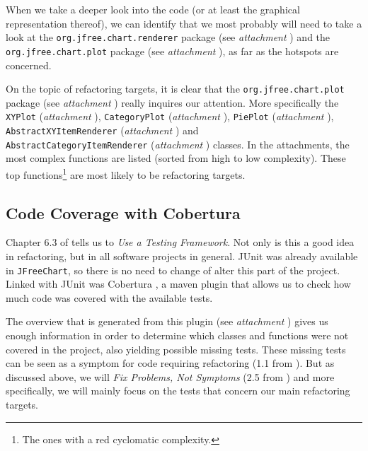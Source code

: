 \documentclass[11pt]{article}
\begin{document}
	When we take a deeper look into the code (or at least the graphical representation thereof), we can identify that we most probably will need to take a look at the \texttt{org.jfree.chart.renderer} package (see \textsl{attachment \pageref{hotspots-package-renderer}}) and the \texttt{org.jfree.chart.plot} package (see \textsl{attachment \pageref{hotspots-package-plot}}), as far as the hotspots are concerned.
	
	On the topic of refactoring targets, it is clear that the \texttt{org.jfree.chart.plot} package (see \textsl{attachment \pageref{refactoring-package-plot}}) really inquires our attention. More specifically the \texttt{XYPlot} (\textsl{attachment \pageref{refactoring-XYPlot}}), \texttt{CategoryPlot} (\textsl{attachment \pageref{refactoring-CategoryPlot}}), \texttt{PiePlot} (\textsl{attachment \pageref{refactoring-PiePlot}}), \texttt{AbstractXYItemRenderer} (\textsl{attachment \pageref{refactoring-AbstractXYItemRenderer}}) and\\ \texttt{AbstractCategoryItemRenderer} (\textsl{attachment \pageref{refactoring-AbstractCategoryItemRenderer}}) classes. In the attachments, the most complex functions are listed (sorted from high to low complexity). These top functions\footnote{The ones with a red cyclomatic complexity.} are most likely to be refactoring targets.
	
	\subsection{Code Coverage with Cobertura}
	\label{sec:coco}
	Chapter 6.3 of \cite{demeyer2009object} tells us to \textsl{Use a Testing Framework}. Not only is this a good idea in refactoring, but in all software projects in general. JUnit was already available in \texttt{JFreeChart}, so there is no need to change of alter this part of the project. Linked with JUnit was \textsf{Cobertura} \cite{cobertura}, a maven plugin that allows us to check how much code was covered with the available tests.
	
	The overview that is generated from this plugin (see \textsl{attachment \pageref{cobertura-begin}}) gives us enough information in order to determine which classes and functions were not covered in the project, also yielding possible missing tests. These missing tests can be seen as a symptom for code requiring refactoring (1.1 from \cite{demeyer2009object}). But as discussed above, we will \textsl{Fix Problems, Not Symptoms} (2.5 from \cite{demeyer2009object}) and more specifically, we will mainly focus on the tests that concern our main refactoring targets.
	
\end{document}
